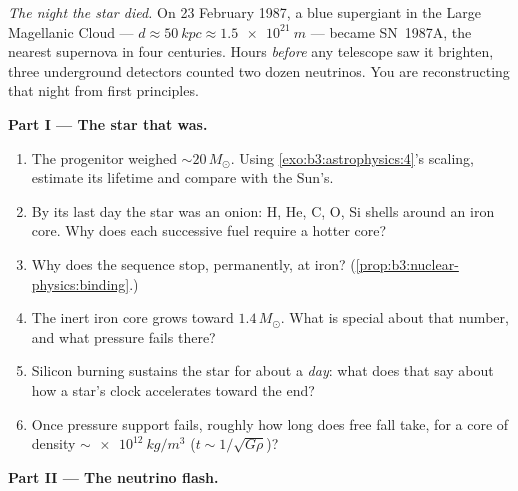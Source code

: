\begin{problem}\label{pb:b3:astrophysics:1}
\emph{The night the star died.} On 23 February 1987, a blue
supergiant in the Large Magellanic Cloud --- $d \approx
\qty{50}{kpc} \approx \qty{1.5e21}{m}$ --- became SN~1987A, the
nearest supernova in four centuries. Hours \emph{before} any
telescope saw it brighten, three underground detectors counted
two dozen neutrinos. You are reconstructing that night from first
principles.

\medskip\noindent\textbf{Part I --- The star that was.}

\begin{enumerate}
  \item The progenitor weighed ${\sim}20\,M_\odot$. Using
        \cref{exo:b3:astrophysics:4}'s scaling, estimate its
        lifetime and compare with the Sun's.
  \item By its last day the star was an onion: H, He, C, O, Si
        shells around an iron core. Why does each successive
        fuel require a hotter core?
  \item Why does the sequence stop, permanently, at iron?
        (\cref{prop:b3:nuclear-physics:binding}.)
  \item The inert iron core grows toward $1.4\,M_\odot$. What is
        special about that number, and what pressure fails
        there?
  \item Silicon burning sustains the star for about a
        \emph{day}: what does that say about how a star's
        clock accelerates toward the end?
  \item Once pressure support fails, roughly how long does free
        fall take, for a core of density
        $\sim\qty{e12}{kg/m^3}$ ($t \sim 1/\sqrt{G\rho}$)?
\end{enumerate}

\medskip\noindent\textbf{Part II --- The neutrino flash.}


\end{problem}
